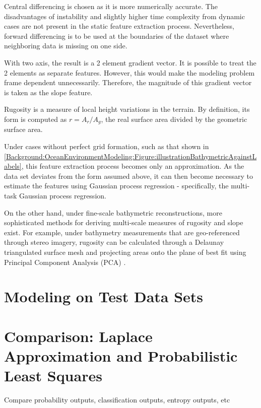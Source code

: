			Central differencing is chosen as it is more numerically accurate. The disadvantages of instability and slightly higher time complexity from dynamic cases are not present in the static feature extraction process. Nevertheless, forward differencing is to be used at the boundaries of the dataset where neighboring data is missing on one side.
						
			With two axis, the result is a 2 element gradient vector. It is possible to treat the 2 elements as separate features. However, this would make the modeling problem frame dependent unnecessarily. Therefore, the magnitude of this gradient vector is taken as the slope feature. 
			
			Rugosity is a measure of local height variations in the terrain. By definition, its form is computed as $r = A_{r}/A_{g}$, the real surface area divided by the geometric surface area.
			
			Under cases without perfect grid formation, such as that shown in \cref{Background:OceanEnvironmentModeling:Figure:illustrationBathymetricAgainstLabels}, this feature extraction process becomes only an approximation. As the data set deviates from the form assumed above, it can then become necessary to estimate the features using Gaussian process regression - specifically, the multi-task Gaussian process regression. 
			
		 	On the other hand, under fine-scale bathymetric reconstructions, more sophisticated methods for deriving multi-scale measures of rugosity and slope exist. For example, under bathymetry measurements that are geo-referenced through stereo imagery, rugosity can be calculated through a Delaunay triangulated surface mesh and projecting areas onto the plane of best fit using Principal Component Analysis (PCA) \cite{StefanWilliams:Rugosity}.
							
			\FloatBarrier
				
	\section{Modeling on Test Data Sets}
	
	\section{Comparison: Laplace Approximation and Probabilistic Least Squares}
	
		Compare probability outputs, classification outputs, entropy outputs, etc
	
